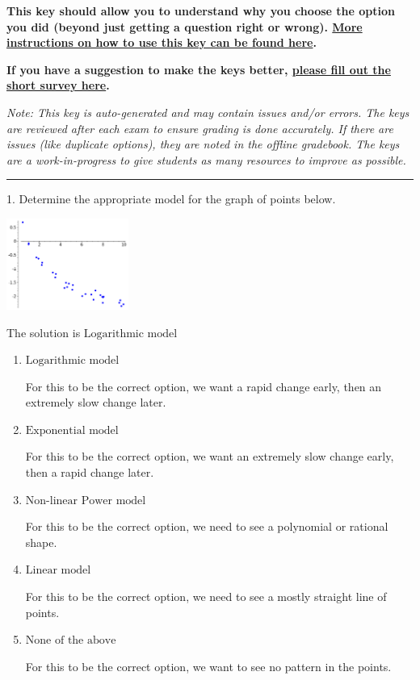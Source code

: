 \documentclass{extbook}[14pt]
\begin{document}
\textbf{This key should allow you to understand why you choose the option you did (beyond just getting a question right or wrong). \href{https://xronos.clas.ufl.edu/mac1105spring2020/courseDescriptionAndMisc/Exams/LearningFromResults}{More instructions on how to use this key can be found here}.}

\textbf{If you have a suggestion to make the keys better, \href{https://forms.gle/CZkbZmPbC9XALEE88}{please fill out the short survey here}.}

\textit{Note: This key is auto-generated and may contain issues and/or errors. The keys are reviewed after each exam to ensure grading is done accurately. If there are issues (like duplicate options), they are noted in the offline gradebook. The keys are a work-in-progress to give students as many resources to improve as possible.}

\rule{\textwidth}{0.4pt}

1. Determine the appropriate model for the graph of points below.
\begin{center} \includegraphics[width=0.3\textwidth]{../Figures/identifyModelGraph12C.png} \end{center} 

The solution is $ \text{Logarithmic model} $ 

\begin{enumerate}[label=\Alph*.] 
\item $ \text{Logarithmic model} $ 

 For this to be the correct option, we want a rapid change early, then an extremely slow change later. 
\item $ \text{Exponential model} $ 

 For this to be the correct option, we want an extremely slow change early, then a rapid change later. 
\item $ \text{Non-linear Power model} $ 

 For this to be the correct option, we need to see a polynomial or rational shape. 
\item $ \text{Linear model} $ 

 For this to be the correct option, we need to see a mostly straight line of points. 
\item $ \text{None of the above} $ 

 For this to be the correct option, we want to see no pattern in the points. 
\end{enumerate} 
 
\end{document}
